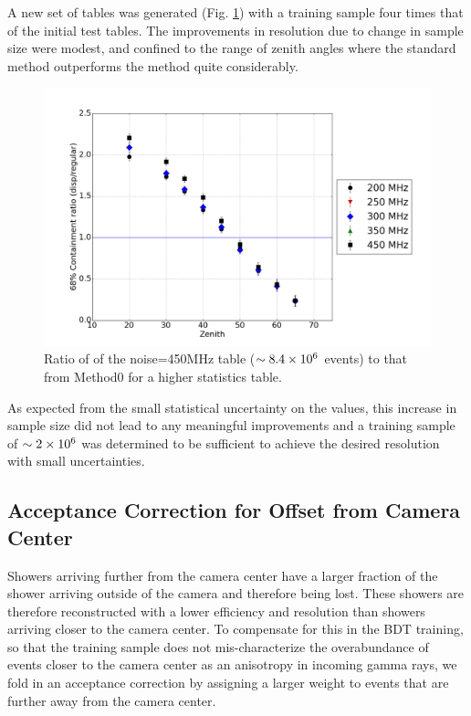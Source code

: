 \documentclass[main.tex]{subfiles}
\begin{document}
A new set of \disp tables was generated (Fig. \ref{fig:disp_ratio_450x4}) with a training sample four times that of the initial test tables. The improvements in resolution due to change in sample size were modest, and confined to the range of zenith angles where the standard method outperforms the \disp method quite considerably.

\begin{figure}[htbp]
  \centering
  \includegraphics[width=0.8\linewidth]{images/disp_450x4size_ratio_xzen}
  \caption[Higher statistics \disp table reconstruction vs noise.]{Ratio of \rse of the noise=450MHz \disp table ($\sim 8.4\times 10^{6}$ events) to that from Method0 for a higher statistics \disp table.}
  \label{fig:disp_ratio_450x4}
\end{figure}

As expected from the small statistical uncertainty on the \rse values, this increase in sample size did not lead to any meaningful improvements and a training sample of $\sim 2\times 10^{6}$ was determined to be sufficient to achieve the desired resolution with small uncertainties.

\subsection{Acceptance Correction for Offset from Camera Center}
Showers arriving further from the camera center have a larger fraction of the shower arriving outside of the camera and therefore being lost. These showers are therefore reconstructed with a lower efficiency and resolution than showers arriving closer to the camera center. To compensate for this in the BDT training, so that the training sample does not mis-characterize the overabundance of events closer to the camera center as an anisotropy in incoming gamma rays, we fold in an acceptance correction by assigning a larger weight to events that are further away from the camera center.
\end{document}
